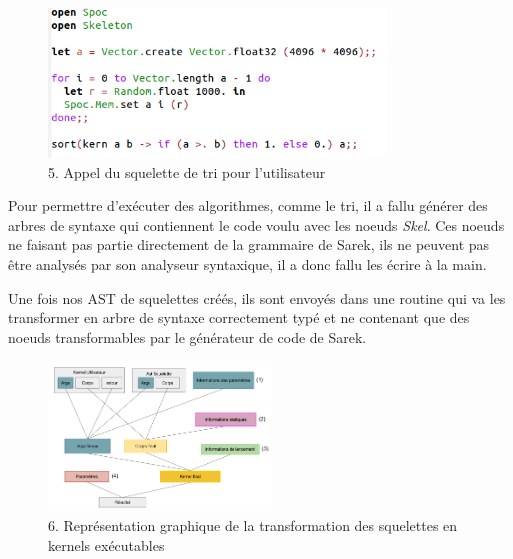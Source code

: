 \documentclass{report}
\begin{document}
\begin{figure}[!h]
\begin{center}
\includegraphics[height=150]{images_finales/sort.png}
\end{center}
\caption{5. Appel du squelette de tri pour l'utilisateur}
\label{test}
\end{figure} \newline

Pour permettre d'exécuter des algorithmes, comme le tri, il a fallu générer des arbres de syntaxe qui contiennent le code voulu avec les noeuds \textit{Skel}. Ces noeuds ne faisant pas partie directement de la grammaire de Sarek, ils ne peuvent pas être analysés par son analyseur syntaxique, il a donc fallu les écrire à la main. \newline

Une fois nos AST de squelettes créés, ils sont envoyés dans une routine qui va les transformer en arbre de syntaxe correctement typé et ne contenant que des noeuds transformables par le générateur de code de Sarek.\newline

\begin{figure}[!h]
\begin{center}
\includegraphics[height=150]{images_finales/fonctionnement_skel.png}
\end{center}
\caption{6. Représentation graphique de la transformation des squelettes en kernels exécutables}
\label{test}
\end{figure} \newline
\end{document}
